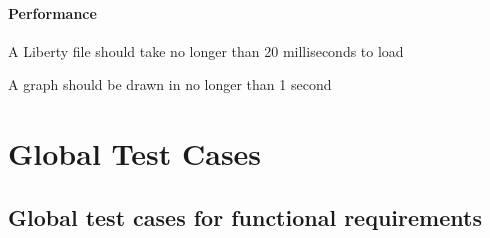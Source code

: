 \documentclass[10pt,a4paper]{report}
\begin{document}
\subsubsection{Performance}
\begin{NFRO-Perf}
    \item A Liberty file should take no longer than 20 milliseconds to load
    \item A graph should be drawn in no longer than 1 second
\end{NFRO-Perf}

\chapter{Global Test Cases}

\section{Global test cases for functional requirements}
\end{document}
